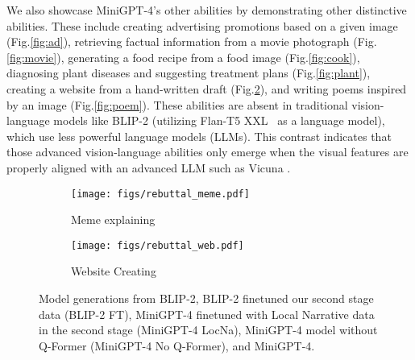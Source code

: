 We also showcase MiniGPT-4's other abilities by demonstrating other distinctive abilities. These include creating advertising promotions based on a given image (Fig.\ref{fig:ad}), retrieving factual information from a movie photograph (Fig.\ref{fig:movie}), generating a food recipe from a food image (Fig.\ref{fig:cook}), diagnosing plant diseases and suggesting treatment plans (Fig.\ref{fig:plant}), creating a website from a hand-written draft (Fig.\ref{fig:ab_website}), and writing poems inspired by an image (Fig.\ref{fig:poem}). These abilities are absent in traditional vision-language models like BLIP-2 (utilizing Flan-T5 XXL~\citep{flanT5} as a language model), which use less powerful language models (LLMs). This contrast indicates that those advanced vision-language abilities only emerge when the visual features are properly aligned with an advanced LLM such as Vicuna \citep{vicuna2023}. 


\begin{figure}[t]
  \begin{subfigure}{0.55\textwidth}
    \centering
    \texttt{[image: figs/rebuttal\_meme.pdf]}
    \caption{Meme explaining}
    \label{fig:ab_meme}
  \end{subfigure}\hfill
  \begin{subfigure}{0.45\textwidth}
    \centering
    \texttt{[image: figs/rebuttal\_web.pdf]}
    \caption{Website Creating}
    \label{fig:ab_website}
  \end{subfigure}
  \caption{Model generations from BLIP-2, BLIP-2 finetuned our second stage data (BLIP-2 FT), MiniGPT-4 finetuned with Local Narrative data in the second stage (MiniGPT-4 LocNa), MiniGPT-4 model without Q-Former (MiniGPT-4 No Q-Former), and MiniGPT-4.}
  \label{fig:overall_label}
  \vspace{-10pt}
\end{figure}







\begin{table}[b]
\vspace{2mm}
\centering
\caption{Quantitative results on advanced vision-language tasks. MiniGPT-4 shows strong performance and successfully responses to 65\% of the requests.}
\end{table}




